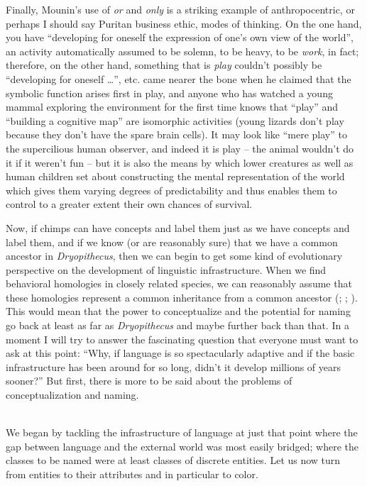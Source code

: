 Finally, Mounin's use of \textit{or} and \textit{only} is a striking example of anthropocentric, or perhaps I should say Puritan business ethic, modes of thinking. On the one hand, you have ``developing for oneself the expression of one's own view of the world'', an activity automatically assumed to be solemn, to be heavy, to be \textit{work}, in fact; therefore, on the other hand, something that is \textit{play} couldn't possibly be ``developing for oneself \ldots'', etc. \citet{Piaget1962} came nearer the bone when he claimed that the symbolic function arises first in play, and anyone who has watched a young mammal exploring the environment for the first time knows that ``play'' and ``building a cognitive map'' are isomorphic activities (young lizards don't play because they don't have the spare brain cells). It may look like ``mere play'' to the supercilious human observer, and indeed it is play -- the animal wouldn't do it if it weren't fun -- but it is also the means by which lower creatures
as well as human children set about constructing the mental representation of the world which gives them varying degrees of predictability and thus enables them to control to a greater extent their own chances of survival.

Now, if chimps can have concepts and label them just as we have concepts and label them, and if we know (or are reasonably sure) that we have a common ancestor in \textit{Dryopithecus}, then we can begin to get some kind of evolutionary perspective on the development of linguistic infrastructure. When we find behavioral homologies in closely related species, we can reasonably assume that these homologies represent a common inheritance from a common ancestor (\citealt{CampbellEtAl1970}; \citealt{Hodos1976}; \citet[Figure~1.4]{Dingwall1979}). This would mean that the power to conceptualize and the potential for naming go back at least as far as \textit{Dryopithecus} and maybe further back than that. In a moment I will try to answer the fascinating question that everyone must want to ask at this point: ``Why, if language is so spectacularly adaptive and if the basic infrastructure has been around for so long, didn't it develop millions of years sooner?'' But first, there is more to be said about the problems of conceptualization and naming.\\\\

We began by tackling the infrastructure of language at just that point where the gap between language and the external world was most easily bridged; where the classes to be named were at least classes of discrete entities. Let us now turn from entities to their attributes and in particular to color.

